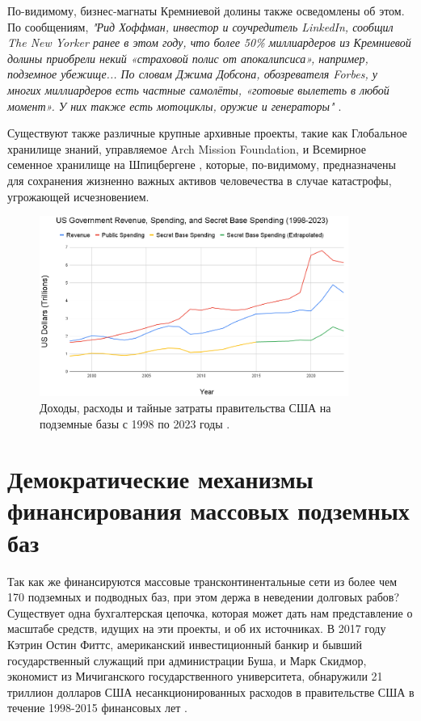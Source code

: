 \documentclass[10pt,twocolumn,letterpaper]{article}
\begin{document}
По-видимому, бизнес-магнаты Кремниевой долины также осведомлены об этом. По сообщениям, \textit{"Рид Хоффман, инвестор и соучредитель LinkedIn, сообщил The New Yorker ранее в этом году, что более 50\% миллиардеров из Кремниевой долины приобрели некий «страховой полис от апокалипсиса», например, подземное убежище... По словам Джима Добсона, обозревателя Forbes, у многих миллиардеров есть частные самолёты, «готовые вылететь в любой момент». У них также есть мотоциклы, оружие и генераторы"} \cite{28}.

Существуют также различные крупные архивные проекты, такие как Глобальное хранилище знаний, управляемое Arch Mission Foundation, \cite{29} и Всемирное семенное хранилище на Шпицбергене \cite{30}, которые, по-видимому, предназначены для сохранения жизненно важных активов человечества в случае катастрофы, угрожающей исчезновением.

\begin{figure}[t]
\begin{center}
\includegraphics[width=0.9\textwidth]{govcrop2.png}
\end{center}
   \caption{Доходы, расходы и тайные затраты правительства США на подземные базы с 1998 по 2023 годы \cite{19}.}
   \label{fig:9}
\end{figure}
\section{Демократические механизмы финансирования массовых подземных баз}

Так как же финансируются массовые трансконтинентальные сети из более чем 170 подземных и подводных баз, при этом держа в неведении долговых рабов? Существует одна бухгалтерская цепочка, которая может дать нам представление о масштабе средств, идущих на эти проекты, и об их источниках. В 2017 году Кэтрин Остин Фиттс, американский инвестиционный банкир и бывший государственный служащий при администрации Буша, и Марк Скидмор, экономист из Мичиганского государственного университета, обнаружили 21 триллион долларов США несанкционированных расходов в правительстве США в течение 1998-2015 финансовых лет \cite{11,12,13}.
\end{document}
